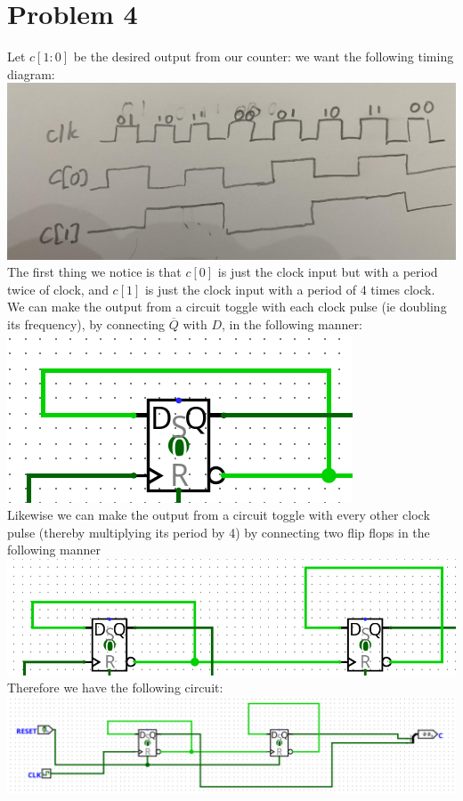 \documentclass[12pt]{article}
\begin{document}
\section*{Problem 4}
Let $c[1:0]$ be the desired output from our counter: we want the following timing diagram:
\\\includegraphics[scale=0.15]{fig4.jpg}\\
The first thing we notice is that $c[0]$ is just the clock input 
but with a period twice of clock, and $c[1]$ is just the clock input 
with a period of 4 times clock. We can make the output from a circuit 
toggle with each clock pulse (ie doubling its frequency), by connecting
$\overline{Q}$ with $D$, in the following manner:\\
\includegraphics[scale=0.5]{fig5.png}\\
Likewise we can make the output from a circuit toggle with every other clock pulse 
(thereby multiplying its period by 4) by connecting two flip flops in the following manner\\
\includegraphics[scale=0.5]{fig6.png}\\
Therefore we have the following circuit:\\
\includegraphics[scale=0.25]{fig7.png}
\end{document}
